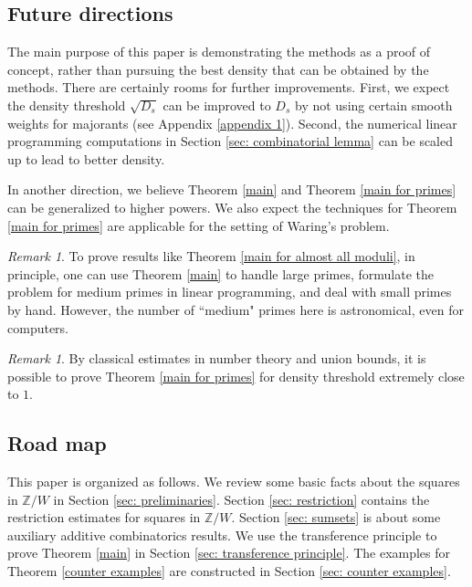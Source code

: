 \documentclass[11pt]{amsart}
\theoremstyle{plain} %
\theoremstyle{remark}
\newtheorem{rem}[thm]{Remark}
\numberwithin{equation}{section}
\newcommand{\Z}{\mathbb{Z}}
\begin{document}
\subsection{Future directions}

The main purpose of this paper is demonstrating the methods as a proof of concept, rather than pursuing the best density that can be obtained by the methods. There are certainly rooms for further improvements. First, we expect the density threshold $\sqrt{D_s}$ can be improved to $D_s$ by not using certain smooth weights for majorants (see Appendix \ref{appendix 1}). Second, the numerical linear programming computations in Section \ref{sec: combinatorial lemma} can be scaled up to lead to better density.

In another direction, we believe Theorem \ref{main} and Theorem \ref{main for primes} can be generalized to higher powers. We also expect the techniques for Theorem \ref{main for primes} are applicable for the setting of Waring's problem.

\begin{rem}
    To prove results like Theorem \ref{main for almost all moduli}, in principle, one can use Theorem \ref{main} to handle large primes, formulate the problem for medium primes in linear programming, and deal with small primes by hand. However, the number of ``medium" primes here is astronomical, even for computers.  
\end{rem}

\begin{rem}
    By classical estimates in number theory and union bounds, it is possible to prove Theorem \ref{main for primes} for density threshold extremely close to $1$.
\end{rem}

\subsection{Road map}

This paper is organized as follows. We review some basic facts about the squares in $\Z/W$ in Section \ref{sec: preliminaries}. Section \ref{sec: restriction} contains the restriction estimates for squares in $\Z/W$. Section \ref{sec: sumsets} is about some auxiliary additive combinatorics results. We use the transference principle to prove Theorem \ref{main} in Section \ref{sec: transference principle}. The examples for Theorem \ref{counter examples} are constructed in Section \ref{sec: counter examples}.
\end{document}
